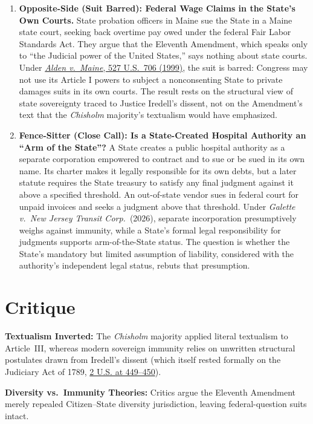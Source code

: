 \documentclass[12pt]{article}
\begin{document}
\begin{enumerate}
\item \textbf{Opposite-Side (Suit Barred): Federal Wage Claims in the State's Own Courts.} State probation officers in Maine sue the State in a Maine state court, seeking back overtime pay owed under the federal Fair Labor Standards Act. They argue that the Eleventh Amendment, which speaks only to ``the Judicial power of the United States,'' says nothing about state courts. Under \href{https://supreme.justia.com/cases/federal/us/527/706/}{\emph{Alden v.\ Maine}, 527 U.S.\ 706 (1999)}, the suit is barred: Congress may not use its Article I powers to subject a nonconsenting State to private damages suits in its own courts. The result rests on the structural view of state sovereignty traced to Justice Iredell's dissent, not on the Amendment's text that the \emph{Chisholm} majority's textualism would have emphasized.

\item \textbf{Fence-Sitter (Close Call): Is a State-Created Hospital Authority an ``Arm of the State''?} A State creates a public hospital authority as a separate corporation empowered to contract and to sue or be sued in its own name. Its charter makes it legally responsible for its own debts, but a later statute requires the State treasury to satisfy any final judgment against it above a specified threshold. An out-of-state vendor sues in federal court for unpaid invoices and seeks a judgment above that threshold. Under \textit{Galette v.\ New Jersey Transit Corp.}\ (2026), separate incorporation presumptively weighs against immunity, while a State's formal legal responsibility for judgments supports arm-of-the-State status. The question is whether the State's mandatory but limited assumption of liability, considered with the authority's independent legal status, rebuts that presumption.

\end{enumerate}

\section{Critique}
\textbf{Textualism Inverted:} The \emph{Chisholm} majority applied literal textualism to Article~III, whereas modern sovereign immunity relies on unwritten structural postulates drawn from Iredell's dissent (which itself rested formally on the Judiciary Act of 1789, \href{https://supreme.justia.com/cases/federal/us/2/419/}{2 U.S. at 449--450}).

\textbf{Diversity vs.\ Immunity Theories:} Critics argue the Eleventh Amendment merely repealed Citizen--State diversity jurisdiction, leaving federal-question suits intact.
\end{document}
